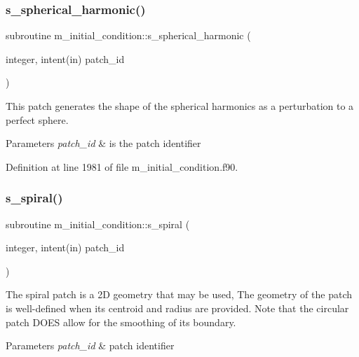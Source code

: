 \subsubsection{\texorpdfstring{s\+\_\+spherical\+\_\+harmonic()}{s\_spherical\_harmonic()}}
{\footnotesize\ttfamily subroutine m\+\_\+initial\+\_\+condition\+::s\+\_\+spherical\+\_\+harmonic (\begin{DoxyParamCaption}\item[{integer, intent(in)}]{patch\+\_\+id }\end{DoxyParamCaption})}



This patch generates the shape of the spherical harmonics as a perturbation to a perfect sphere. 


\begin{DoxyParams}{Parameters}
{\em patch\+\_\+id} & is the patch identifier \\
\hline
\end{DoxyParams}


Definition at line 1981 of file m\+\_\+initial\+\_\+condition.\+f90.

\mbox{\label{namespacem__initial__condition_ac4540baa01372eb3df51b268769fa6fc}} 
\subsubsection{\texorpdfstring{s\+\_\+spiral()}{s\_spiral()}}
{\footnotesize\ttfamily subroutine m\+\_\+initial\+\_\+condition\+::s\+\_\+spiral (\begin{DoxyParamCaption}\item[{integer, intent(in)}]{patch\+\_\+id }\end{DoxyParamCaption})}



The spiral patch is a 2D geometry that may be used, The geometry of the patch is well-\/defined when its centroid and radius are provided. Note that the circular patch D\+O\+ES allow for the smoothing of its boundary. 


\begin{DoxyParams}{Parameters}
{\em patch\+\_\+id} & patch identifier \\
\hline
\end{DoxyParams}


